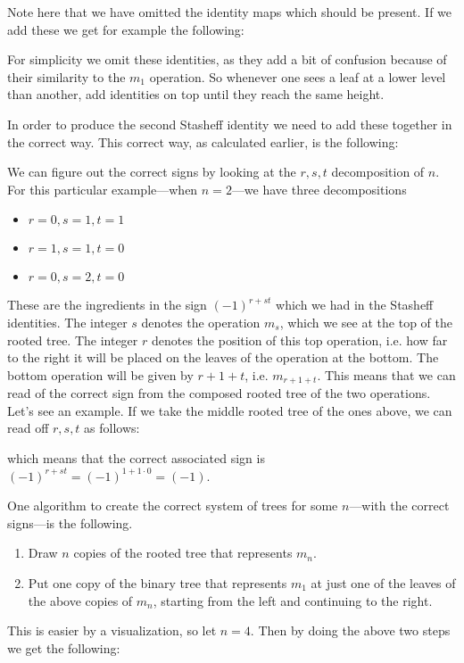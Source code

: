 Note here that we have omitted the identity maps which should be present. If we add these we get for example the following:


For simplicity we omit these identities, as they add a bit of confusion because of their similarity to the $m_1$ operation. So whenever one sees a leaf at a lower level than another, add identities on top until they reach the same height.

In order to produce the second Stasheff identity we need to add these together in the correct way. This correct way, as calculated earlier, is the following:


We can figure out the correct signs by looking at the $r, s, t$ decomposition of $n$. For this particular example---when $n=2$---we have three decompositions
\begin{itemize}
    \item $r=0, s=1, t=1$
    \item $r=1, s=1, t=0$
    \item $r=0, s=2, t=0$
\end{itemize}
These are the ingredients in the sign $(-1)^{r+st}$ which we had in the Stasheff identities. The integer $s$ denotes the operation $m_s$, which we see at the top of the rooted tree. The integer $r$ denotes the position of this top operation, i.e. how far to the right it will be placed on the leaves of the operation at the bottom. The bottom operation will be given by $r+1+t$, i.e. $m_{r+1+t}$. This means that we can read of the correct sign from the composed rooted tree of the two operations. Let's see an example. If we take the middle rooted tree of the ones above, we can read off $r, s, t$ as follows: 


which means that the correct associated sign is $(-1)^{r+st}=(-1)^{1+1\cdot 0}=(-1)$. 





One algorithm to create the correct system of trees for some $n$---with the correct signs---is the following. 
\begin{enumerate}
    \item Draw $n$ copies of the rooted tree that represents $m_n$. 
    \item Put one copy of the binary tree that represents $m_1$ at just one of the leaves of the above copies of $m_n$, starting from the left and continuing to the right. 
\end{enumerate}
This is easier by a visualization, so let $n=4$. Then by doing the above two steps we get the following:

